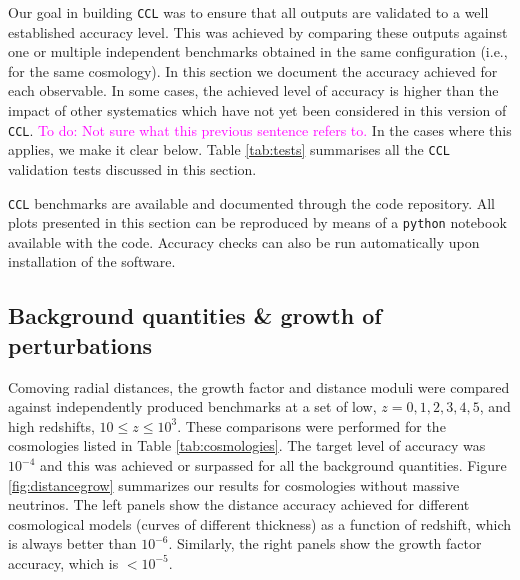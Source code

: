 \documentclass[\docopts]{\docclass}
\newcommand{\todo}[1]{\textcolor{magenta}{To do: #1}}
\newcommand{\ccl}{{\tt CCL}\xspace}
\begin{document}
Our goal in building \ccl was to ensure that all outputs are validated to a well established accuracy level. This was achieved by comparing these outputs against one or multiple independent benchmarks obtained in the same configuration (i.e., for the same cosmology). In this section we document the accuracy achieved for each observable. In some cases, the achieved level of accuracy is higher than the impact of other systematics which have not yet been considered in this version of \ccl. \todo{Not sure what this previous sentence refers to.} In the cases where this applies, we make it clear below. 
Table \ref{tab:tests} summarises all the \ccl validation tests discussed in this section.



\ccl benchmarks are available and documented through the code repository. All plots presented in this section can be reproduced by means of a {\tt python} notebook available with the code. Accuracy checks can also be run automatically upon installation of the software.

\subsection{Background quantities \& growth of perturbations}

Comoving radial distances, the growth factor and distance moduli were compared against independently produced benchmarks at a set of low, $z = 0,1,2,3,4,5$, and high redshifts, $10\leq z \leq 10^3$. These comparisons were performed for the cosmologies listed in Table \ref{tab:cosmologies}. The target level of accuracy was $10^{-4}$ and this was achieved or surpassed for all the background quantities. Figure \ref{fig:distancegrow} summarizes our results for cosmologies without massive neutrinos. The left panels show the distance accuracy achieved for different cosmological models (curves of different thickness) as a function of redshift, which is always better than $10^{-6}$. Similarly, the right panels show the growth factor accuracy, which is $<10^{-5}$. 
\end{document}
